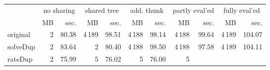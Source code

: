 \makeatletter
\begin{tabular}{lrrrrrrrrrr}
 \\
& \multicolumn{2}{c}{no sharing}& \multicolumn{2}{c}{shared tree}& \multicolumn{2}{c}{add. thunk}& \multicolumn{2}{c}{partly eval'ed}& \multicolumn{2}{c}{fully eval'ed} \\
& MB & sec.& MB & sec.& MB & sec.& MB & sec.& MB & sec. \\ \midrule 
original%
&
 {\def\@currentlabel{2}\label{stats:slow:Original:Unshared:mem}2} &
 {\def\@currentlabel{80.38}\label{stats:slow:Original:Unshared:time}80.38}&
 {\def\@currentlabel{4\,189}\label{stats:slow:Original:Shared:mem}4\,189} &
 {\def\@currentlabel{98.51}\label{stats:slow:Original:Shared:time}98.51}&
 {\def\@currentlabel{4\,188}\label{stats:slow:Original:SharedThunk:mem}4\,188} &
 {\def\@currentlabel{98.14}\label{stats:slow:Original:SharedThunk:time}98.14}&
 {\def\@currentlabel{4\,188}\label{stats:slow:Original:SharedEvaled:mem}4\,188} &
 {\def\@currentlabel{99.64}\label{stats:slow:Original:SharedEvaled:time}99.64}&
 {\def\@currentlabel{4\,189}\label{stats:slow:Original:SharedFull:mem}4\,189} &
 {\def\@currentlabel{104.07}\label{stats:slow:Original:SharedFull:time}104.07} \\
\textsf{solveDup}%
&
 {\def\@currentlabel{2}\label{stats:slow:SolveDup:Unshared:mem}2} &
 {\def\@currentlabel{83.64}\label{stats:slow:SolveDup:Unshared:time}83.64}&
 {\def\@currentlabel{2}\label{stats:slow:SolveDup:Shared:mem}2} &
 {\def\@currentlabel{80.40}\label{stats:slow:SolveDup:Shared:time}80.40}&
 {\def\@currentlabel{4\,188}\label{stats:slow:SolveDup:SharedThunk:mem}4\,188} &
 {\def\@currentlabel{98.50}\label{stats:slow:SolveDup:SharedThunk:time}98.50}&
 {\def\@currentlabel{4\,188}\label{stats:slow:SolveDup:SharedEvaled:mem}4\,188} &
 {\def\@currentlabel{97.58}\label{stats:slow:SolveDup:SharedEvaled:time}97.58}&
 {\def\@currentlabel{4\,189}\label{stats:slow:SolveDup:SharedFull:mem}4\,189} &
 {\def\@currentlabel{104.11}\label{stats:slow:SolveDup:SharedFull:time}104.11} \\
\textsf{rateDup}%
&
 {\def\@currentlabel{2}\label{stats:slow:RateDup:Unshared:mem}2} &
 {\def\@currentlabel{75.99}\label{stats:slow:RateDup:Unshared:time}75.99}&
 {\def\@currentlabel{5}\label{stats:slow:RateDup:Shared:mem}5} &
 {\def\@currentlabel{76.02}\label{stats:slow:RateDup:Shared:time}76.02}&
 {\def\@currentlabel{5}\label{stats:slow:RateDup:SharedThunk:mem}5} &
 {\def\@currentlabel{76.00}\label{stats:slow:RateDup:SharedThunk:time}76.00}&
 {\def\@currentlabel{5}\label{stats:slow:RateDup:SharedEvaled:mem}5} &

\end{tabular}
